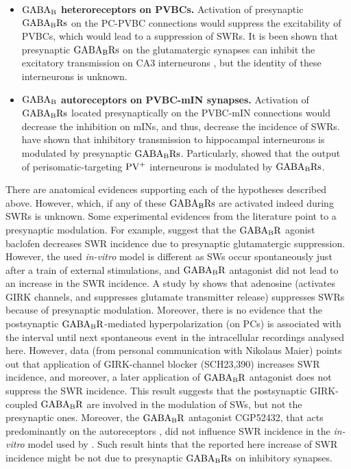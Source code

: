 \begin{itemize}
      \item \textbf{$\rm GABA_B$ heteroreceptors on PVBCs.}
        Activation of presynaptic $\rm GABA_BRs$ on the PC-PVBC connections
        would suppress the excitability of PVBCs, which would lead to a
        suppression of SWRs. It is been shown that presynaptic $\rm GABA_BRs$
        on the glutamatergic synapses can inhibit the excitatory transmission
        on CA3 interneurons \citep{Lei2003}, but the identity of these
        interneurons is unknown.

      \item \textbf{$\rm GABA_B$ autoreceptors on PVBC-mIN synapses.}
        Activation of $\rm GABA_BRs$ located presynaptically on the PVBC-mIN
        connections would decrease the inhibition on mINs, and thus, decrease
        the incidence of SWRs. \cite{Lei2003} have shown that inhibitory
        transmission to hippocampal interneurons is modulated by presynaptic
        $\rm GABA_BRs$. Particularly, \cite{Booker2013} showed that the output
        of perisomatic-targeting $\rm PV^+$ interneurons is modulated by $\rm
        GABA_BRs$.
    \end{itemize}

    There are anatomical evidences supporting each of the hypotheses described
    above. However, which, if any of these $\rm GABA_BRs$ are activated indeed
    during SWRs is unknown. Some experimental evidences from the literature
    point to a presynaptic modulation. For example, \cite{Hollnagel2014}
    suggest that the $\rm GABA_BR$ agonist baclofen decreases SWR incidence due
    to presynaptic glutamatergic suppression. However, the used
    \textit{in-vitro} model is different as SWs occur spontaneously just after
    a train of external stimulations, and $\rm GABA_BR$ antagonist did not lead
    to an increase in the SWR incidence. A study by \cite{Maier2012} shows that
    adenosine (activates GIRK channels, and suppresses glutamate transmitter
    release) suppresses SWRs because of presynaptic modulation.  Moreover, there
    is no evidence that the postsynaptic $\rm GABA_BR$-mediated
    hyperpolarization (on PCs) is associated with the interval until next
    spontaneous event in the intracellular recordings analysed here. However,
    data (from personal communication with Nikolaus Maier) points out that
    application of GIRK-channel blocker (SCH23,390) increases SWR incidence, and
    moreover, a later application of $\rm GABA_BR$ antagonist does not suppress
    the SWR incidence. This result suggests that the postsynaptic GIRK-coupled
    $\rm GABA_BR$ are involved in the modulation of SWs, but not the
    presynaptic ones. Moreover, the $\rm GABA_BR$ antagonist CGP52432, that
    acts predominantly on the autoreceptors \citep{Lanza1993}, did not
    influence SWR incidence in the \textit{in-vitro} model used by
    \cite{Hofer2015}. Such result hints that the reported here increase of SWR
    incidence might be not due to presynaptic $\rm GABA_BRs$ on inhibitory
    synapses.
    

